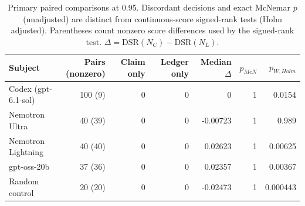 \begin{table}[tbp]
\centering\small
\setlength{\tabcolsep}{4pt}
\caption{Primary paired comparisons at 0.95. Discordant decisions and exact McNemar $p$ (unadjusted) are distinct from continuous-score signed-rank tests (Holm adjusted). Parentheses count nonzero score differences used by the signed-rank test. $\Delta=\mathrm{DSR}(N_C)-\mathrm{DSR}(N_L)$.}\label{tab:paired}
\begin{tabular}{lrrrrrr}
\toprule
Subject & \shortstack{Pairs\\(nonzero)} & Claim only & Ledger only & Median $\Delta$ & $p_{McN}$ & $p_{W,Holm}$ \\
\midrule
Codex (gpt-6.1-sol) & 100 (9) & 0 & 0 & 0 & 1 & 0.0154 \\
Nemotron Ultra & 40 (39) & 0 & 0 & -0.00723 & 1 & 0.989 \\
Nemotron Lightning & 40 (40) & 0 & 0 & 0.02623 & 1 & 0.00625 \\
gpt-oss-20b & 37 (36) & 0 & 0 & 0.02357 & 1 & 0.00367 \\
Random control & 20 (20) & 0 & 0 & -0.02473 & 1 & 0.000443 \\
\bottomrule
\end{tabular}
\end{table}
